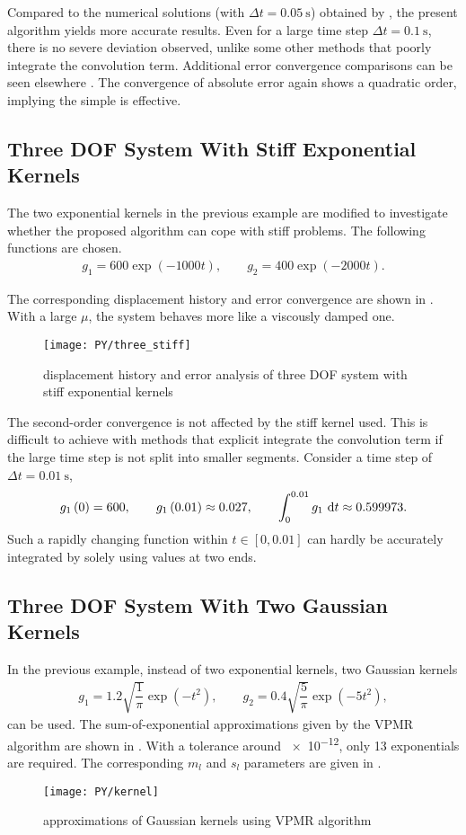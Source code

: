 Compared to the numerical solutions (with $\Delta{}t=\SI{0.05}{\second}$) obtained by \citet{Cortes2009}, the present algorithm yields more accurate results. Even for a large time step $\Delta{}t=\SI{0.1}{\second}$, there is no severe deviation observed, unlike some other methods \citep{Puthanpurayil2014,Liu2014} that poorly integrate the convolution term. Additional error convergence comparisons can be seen elsewhere \citep{Liu2023}. The convergence of absolute error again shows a quadratic order, implying the simple  is effective.
\subsection{Three DOF System With Stiff Exponential Kernels}
The two exponential kernels in the previous example are modified to investigate whether the proposed algorithm can cope with stiff problems. The following functions are chosen.
\begin{gather}
g_1=600\exp\left(-1000t\right),\qquad
g_2=400\exp\left(-2000t\right).
\end{gather}

The corresponding displacement history and error convergence are shown in . With a large $\mu$, the system behaves more like a viscously damped one.
\begin{figure}[H]
\centering
\texttt{[image: PY/three\_stiff]}
\caption{displacement history and error analysis of three DOF system with stiff exponential kernels}\label{fig:three_stiff}
\end{figure}
The second-order convergence is not affected by the stiff kernel used. This is difficult to achieve with methods that explicit integrate the convolution term if the large time step is not split into smaller segments. Consider a time step of $\Delta{}t=\SI{0.01}{\second}$,
\begin{gather}
g_1\left(0\right)=600,\qquad
g_1\left(0.01\right)\approx\num{0.027},\qquad\int_{0}^{0.01}g_1~\mathrm{d}t\approx0.599973.
\end{gather}
Such a rapidly changing function within $t\in[0,0.01]$ can hardly be accurately integrated by solely using values at two ends.
\subsection{Three DOF System With Two Gaussian Kernels}
In the previous example, instead of two exponential kernels, two Gaussian kernels
\begin{gather}
g_1=1.2\sqrt{\dfrac{1}{\pi}}\exp\left(-t^2\right),\qquad
g_2=0.4\sqrt{\dfrac{5}{\pi}}\exp\left(-5t^2\right),
\end{gather}
can be used. The sum-of-exponential approximations given by the VPMR algorithm are shown in . With a tolerance around \num{e-12}, only \num{13} exponentials are required. The corresponding $m_l$ and $s_l$ parameters are given in .
\begin{figure}[H]
\centering
\texttt{[image: PY/kernel]}
\caption{approximations of Gaussian kernels using VPMR algorithm}\label{fig:vpmr}
\end{figure}

